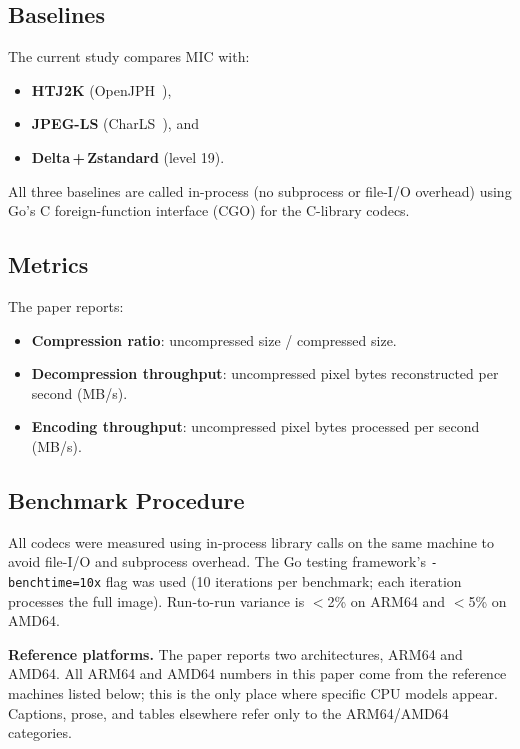 \documentclass[journal]{IEEEtran}
\begin{document}
\subsection{Baselines}

The current study compares MIC with:
\begin{itemize}
  \item \textbf{HTJ2K} (OpenJPH~\cite{openjph}),
  \item \textbf{JPEG-LS} (CharLS~\cite{charls}), and
  \item \textbf{Delta\,+\,Zstandard} (level 19).
\end{itemize}

All three baselines are called in-process (no subprocess or file-I/O overhead)
using Go's C foreign-function interface (CGO) for the C-library codecs.

\subsection{Metrics}

The paper reports:
\begin{itemize}
  \item \textbf{Compression ratio}: uncompressed size / compressed size.
  \item \textbf{Decompression throughput}: uncompressed pixel bytes
  reconstructed per second (MB/s).
  \item \textbf{Encoding throughput}: uncompressed pixel bytes processed per
  second (MB/s).
\end{itemize}

\subsection{Benchmark Procedure}
\label{subsec:bench-procedure}

All codecs were measured using in-process library calls on the same machine to
avoid file-I/O and subprocess overhead. The Go testing framework's
\texttt{-benchtime=10x} flag was used (10 iterations per benchmark; each
iteration processes the full image). Run-to-run variance is $<$2\% on ARM64
and $<$5\% on AMD64.

\textbf{Reference platforms.} The paper reports two architectures, ARM64 and
AMD64. All ARM64 and AMD64 numbers in this paper come from the reference
machines listed below; this is the only place where specific CPU models
appear. Captions, prose, and tables elsewhere refer only to the ARM64/AMD64
categories.
\end{document}
